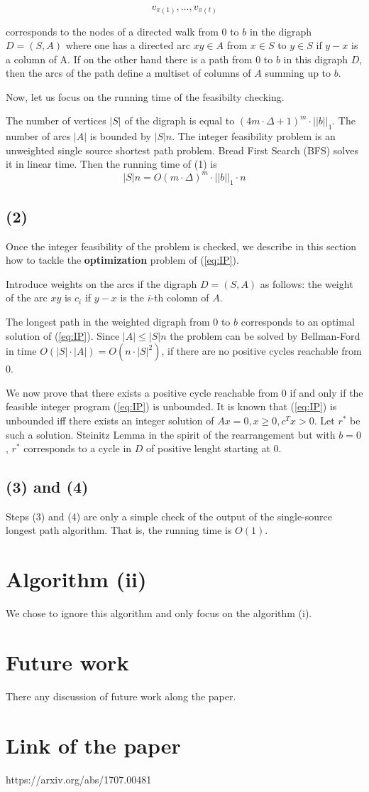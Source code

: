 \documentclass[12pt]{article}
\theoremstyle{definition}
\begin{document}
$$
v_{\pi(1)}, \dots, v_{\pi(t)}
$$

corresponds to the nodes of a directed walk from $0$ to $b$ in the digraph $D = (S, A)$ where one has a directed arc $xy \in A$ from $x \in S$ to $y \in S$ if $y - x$ is a column of A. If on the other hand there is a path from $0$ to $b$ in this digraph $D$, then the arcs of the path define a multiset of columns of $A$ summing up to $b$.

Now, let us focus on the running time of the feasibilty checking.

The number of vertices $|S|$ of the digraph is equal to $(4 m \cdot \Delta + 1)^m \cdot ||b||_1$. The number of arcs $|A|$ is bounded by $|S|n$. The integer feasibility problem is an unweighted single source shortest path problem. Bread First Search (BFS) solves it in linear time. Then the running time of (1) is 
$$
|S|n = O(m \cdot \Delta)^m \cdot ||b||_1 \cdot n
$$

\subsection{(2)}

Once the integer feasibility of the problem is checked, we describe in this section how to tackle the \textbf{optimization} problem of (\ref{eq:IP}). 

Introduce weights on the arcs if the digraph $D = (S, A)$ as follows: the weight of the arc $xy$ is $c_i$ if $y-x$ is the $i$-th colomn of $A$. 

The longest path in the weighted digraph from $0$ to $b$ corresponds to an optimal solution of (\ref{eq:IP}). Since $|A| \leq |S| n$ the problem can be solved by Bellman-Ford in time $O(|S| \cdot |A|) = O(n \cdot |S|^2)$, if there are no positive cycles reachable from $0$.

We now prove that there exists a positive cycle reachable from $0$ if and only if the feasible integer program (\ref{eq:IP}) is unbounded. It is known that (\ref{eq:IP}) is unbounded iff there exists an integer solution of $Ax=0, x \geq 0, c^Tx > 0$. Let $r^*$ be such a solution. Steinitz Lemma in the spirit of the rearrangement but with $b=0$, $r^*$ corresponds to a cycle in $D$ of positive lenght starting at $0$.


\subsection{(3) and (4)}
Steps (3) and (4) are only a simple check of the output of the single-source longest path algorithm. That is, the running time is $O(1)$.


\section{Algorithm (ii)}
We chose to ignore this algorithm and only focus on the algorithm (i).

\section{Future work}

There any discussion of future work along the paper.

\section{Link of the paper}

https://arxiv.org/abs/1707.00481
\end{document}
